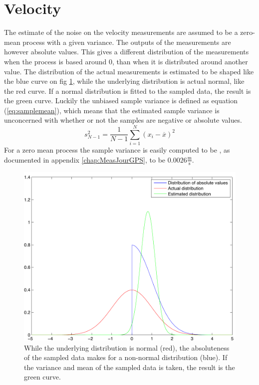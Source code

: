 \section{Velocity}
The estimate of the noise on the velocity measurements are assumed to be a zero-mean process with a given variance. The outputs of the measurements are however absolute values. This gives a different distribution of the measurements when the process is based around 0, than when it is distributed around another value. The distribution of the actual measurements is estimated to be shaped like the blue curve on fig \ref{fig:absdistrib}, while the underlying distribution is actual normal, like the red curve. If a normal distribution is fitted to the sampled data, the result is the green curve. Luckily the unbiased sample variance is defined as equation (\ref{eq:samplemean}), which means that the estimated sample variance is unconcerned with whether or not the samples are negative or absolute values.
\begin{equation}
s^2_{N-1} = \frac{1}{N-1} \sum^N_{i=1}(x_i-\overline{x})^2
\end{equation}
\label{eq:samplemean} For a zero mean process the sample variance is easily computed to be , as documented in appendix \ref{chap:MeasJourGPS}, to be $0.0026\frac{\mathrm{m}}{\mathrm{s}}$.
\begin{figure}[htbp]
	\centering
		\includegraphics[width=\textwidth]{img/absdistrib.pdf}
	\caption{While the underlying distribution is normal (red), the absoluteness of the sampled data makes for a non-normal distribution (blue). If the variance and mean of the sampled data is taken, the result is the green curve.}
	\label{fig:absdistrib}
\end{figure}